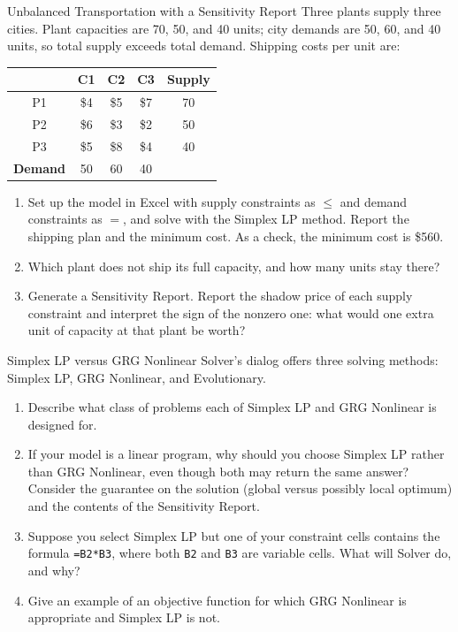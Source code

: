\begin{ex}{Unbalanced Transportation with a Sensitivity Report}{}
\label{ex:excel-unbalanced-transportation}
 Three plants supply three cities.  Plant capacities are 70, 50, and 40 units; city demands are 50, 60, and 40 units, so total supply exceeds total demand.  Shipping costs per unit are:

\begin{center}
\begin{tabular}{c|c|c|c|c}
 & C1 & C2 & C3 & \textbf{Supply} \\
\hline
P1 & \$4 & \$5 & \$7 & 70 \\
P2 & \$6 & \$3 & \$2 & 50 \\
P3 & \$5 & \$8 & \$4 & 40 \\
\hline
\textbf{Demand} & 50 & 60 & 40 & \\
\end{tabular}
\end{center}

\begin{enumerate}
\item Set up the model in Excel with supply constraints as $\leq$ and demand constraints as $=$, and solve with the Simplex LP method.  Report the shipping plan and the minimum cost.  As a check, the minimum cost is \$560.
\item Which plant does not ship its full capacity, and how many units stay there?
\item Generate a Sensitivity Report.  Report the shadow price of each supply constraint and interpret the sign of the nonzero one: what would one extra unit of capacity at that plant be worth?
\end{enumerate}
\exrefs{\S\ref{sec:excel-solver}, \S\ref{sec:transportation-problem}}
\end{ex}


\begin{ex}{Simplex LP versus GRG Nonlinear}{}
\label{ex:excel-solver-methods}
 Solver's dialog offers three solving methods: Simplex LP, GRG Nonlinear, and Evolutionary.
\begin{enumerate}
\item Describe what class of problems each of Simplex LP and GRG Nonlinear is designed for.
\item If your model is a linear program, why should you choose Simplex LP rather than GRG Nonlinear, even though both may return the same answer?  Consider the guarantee on the solution (global versus possibly local optimum) and the contents of the Sensitivity Report.
\item Suppose you select Simplex LP but one of your constraint cells contains the formula \texttt{=B2*B3}, where both \texttt{B2} and \texttt{B3} are variable cells.  What will Solver do, and why?
\item Give an example of an objective function for which GRG Nonlinear is appropriate and Simplex LP is not.
\end{enumerate}
\exrefs{\S\ref{sec:excel-solver}}
\end{ex}

